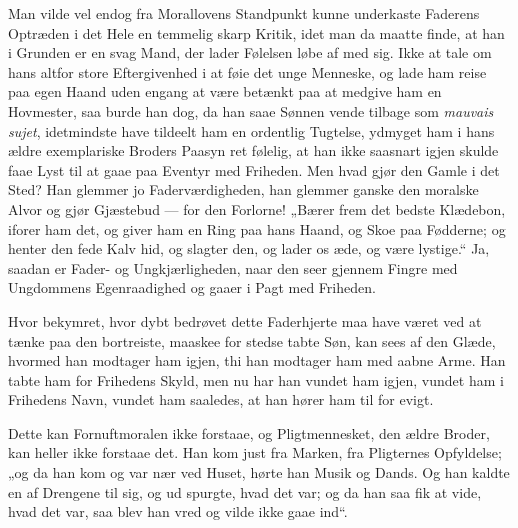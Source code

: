 \documentclass[12pt]{book}
\begin{document}
Man vilde vel endog fra Morallovens Standpunkt kunne underkaste
Faderens Optræden i det Hele en temmelig skarp Kritik, idet man da
maatte finde, at han i Grunden er en svag Mand, der lader Følelsen
løbe af med sig. Ikke at tale om hans altfor store Eftergivenhed i
at føie det unge Menneske, og lade ham reise paa egen Haand uden
engang at være betænkt paa at medgive ham en Hovmester, saa burde
han dog, da han saae Sønnen vende tilbage som \textit{mauvais
sujet}, idetmindste have tildeelt ham en ordentlig Tugtelse, ydmyget
ham i hans ældre exemplariske Broders Paasyn ret følelig, at han
ikke saasnart igjen skulde faae Lyst til at gaae paa Eventyr med
Friheden. Men hvad gjør den Gamle i det Sted? Han glemmer jo
Faderværdigheden, han glemmer ganske den moralske Alvor og gjør
Gjæstebud --- for den Forlorne! „Bærer frem det bedste Klædebon,
iforer ham det, og giver ham en Ring paa hans Haand, og Skoe paa
Fødderne; og henter den fede Kalv hid, og slagter den, og lader os
æde, og være lystige.“ Ja, saadan er Fader- og Ungkjærligheden, naar
den seer gjennem Fingre med Ungdommens Egenraadighed og gaaer i Pagt
med Friheden.

Hvor bekymret, hvor dybt bedrøvet dette Faderhjerte maa have været
ved at tænke paa den bortreiste, maaskee for stedse tabte Søn, kan
sees af den Glæde, hvormed han modtager ham igjen, thi han modtager
ham med aabne Arme. Han tabte ham for Frihedens Skyld, men nu har
han vundet ham igjen, vundet ham i Frihedens Navn, vundet ham
saaledes, at han hører ham til for evigt.

Dette kan Fornuftmoralen ikke forstaae, og Pligtmennesket, den ældre
Broder, kan heller ikke forstaae det. Han kom just fra Marken, fra
Pligternes Opfyldelse; „og da han kom og var nær ved Huset, hørte
han Musik og Dands. Og han kaldte en af Drengene til sig, og ud\-
spurgte, hvad det var; og da han saa fik at vide, hvad det var, saa
blev han vred og vilde ikke gaae ind“.
\end{document}
